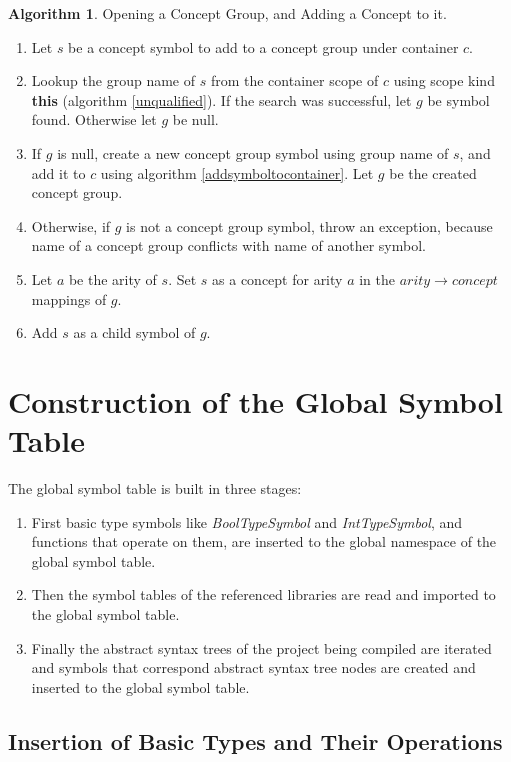 \documentclass[a4paper,oneside,11pt]{book}
\theoremstyle{definition}
\newtheorem{algo}{Algorithm}[section]
\begin{document}
\begin{algo}\label{addtoconceptgroup} Opening a Concept Group, and Adding a Concept to it.
\begin{enumerate}
\item
Let $s$ be a concept symbol to add to a concept group under container $c$.
\item
Lookup the group name of $s$ from the container scope of $c$ using scope kind \textbf{this} (algorithm \ref{unqualified}).
If the search was successful, let $g$ be symbol found. Otherwise let $g$ be null.
\item
If $g$ is null, create a new concept group symbol using group name of $s$, and add it to $c$ using
algorithm \ref{addsymboltocontainer}. Let $g$ be the created concept group.
\item
Otherwise, if $g$ is not a concept group symbol, throw an exception, because name of a concept group
conflicts with name of another symbol.
\item
Let $a$ be the arity of $s$. Set $s$ as a concept for arity $a$ in the $arity \rightarrow concept$ mappings of $g$.
\item
Add $s$ as a child symbol of $g$.
\end{enumerate}
\end{algo}

\section{Construction of the Global Symbol Table}

The global symbol table is built in three stages:

\begin{enumerate}
\item
First basic type symbols like \emph{BoolTypeSymbol} and \emph{IntTypeSymbol}, and functions that operate on them,
are inserted to the global namespace of the global symbol table.

\item
Then the symbol tables of the referenced libraries are read and imported to the global symbol table.

\item
Finally the abstract syntax trees of the project being compiled are iterated
and symbols that correspond abstract syntax tree nodes are created and inserted to the global symbol table.
\end{enumerate}

\subsection{Insertion of Basic Types and Their Operations}\label{basictypeoperations}
\end{document}

